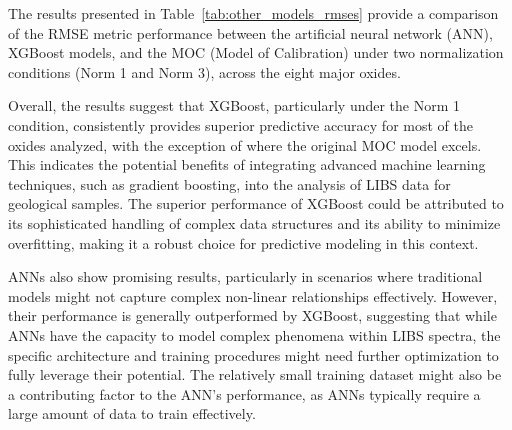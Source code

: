 The results presented in Table~\ref{tab:other_models_rmses} provide a comparison of the RMSE metric performance between the artificial neural network (ANN), XGBoost models, and the MOC (Model of Calibration) under two normalization conditions (Norm 1 and Norm 3), across the eight major oxides.

Overall, the results suggest that XGBoost, particularly under the Norm 1 condition, consistently provides superior predictive accuracy for most of the oxides analyzed, with the exception of  where the original MOC model excels.
This indicates the potential benefits of integrating advanced machine learning techniques, such as gradient boosting, into the analysis of LIBS data for geological samples.
The superior performance of XGBoost could be attributed to its sophisticated handling of complex data structures and its ability to minimize overfitting, making it a robust choice for predictive modeling in this context.

ANNs also show promising results, particularly in scenarios where traditional models might not capture complex non-linear relationships effectively.
However, their performance is generally outperformed by XGBoost, suggesting that while ANNs have the capacity to model complex phenomena within LIBS spectra, the specific architecture and training procedures might need further optimization to fully leverage their potential.
The relatively small training dataset might also be a contributing factor to the ANN's performance, as ANNs typically require a large amount of data to train effectively.

